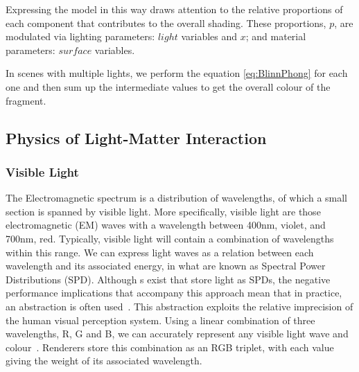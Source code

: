 Expressing the model in this way draws attention to the relative proportions of each component that contributes to the overall shading. These proportions, \begin{math}p\end{math}, are modulated via lighting parameters:  \begin{math}light\end{math} variables and \begin{math}x\end{math}; and material parameters: \begin{math}surface\end{math} variables.

In scenes with multiple lights, we perform the equation \ref{eq:BlinnPhong} for each one and then sum up the intermediate values to get the overall colour of the fragment.

\subsection{Physics of Light-Matter Interaction} \label{PhysicsOfLightMatterInteraction}

\subsubsection{Visible Light}

The Electromagnetic spectrum is a distribution of wavelengths, of which a small section is spanned by visible light. More specifically, visible light are those electromagnetic (EM) waves with a wavelength between 400nm, violet, and 700nm, red. Typically, visible light will contain a combination of wavelengths within this range. We can express light waves as a relation between each wavelength and its associated energy, in what are known as Spectral Power Distributions (SPD). Although s exist that store light as SPDs, the negative performance implications that accompany this approach mean that in practice, an abstraction is often used~\cite{SpectralRendering}. This abstraction exploits the relative imprecision of the human visual perception system. Using a linear combination of three wavelengths, R, G and B, we can accurately represent any visible light wave and colour~\cite{RGBColours}. Renderers store this combination as an RGB triplet, with each value giving the weight of its associated wavelength.


